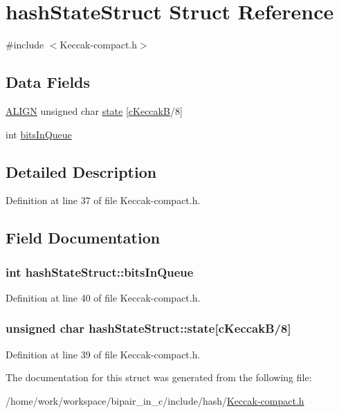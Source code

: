 \hypertarget{structhashStateStruct}{\section{hash\-State\-Struct Struct Reference}
\label{structhashStateStruct}
}


{\ttfamily \#include $<$Keccak-\/compact.\-h$>$}

\subsection*{Data Fields}
\begin{DoxyCompactItemize}
\item 
\hyperlink{Keccak-compact_8h_ae4ff5a07c6ff43ed11a3887ef7d524f2}{A\-L\-I\-G\-N} unsigned char \hyperlink{structhashStateStruct_a812d0b840fb1fe45c71da4b058d60014}{state} \mbox{[}\hyperlink{Keccak-compact-settings_8h_aadd233299e8a09d586ace2b1e0a35723}{c\-Keccak\-B}/8\mbox{]}
\item 
int \hyperlink{structhashStateStruct_a8bb9012062ade9b82adc1de210582db8}{bits\-In\-Queue}
\end{DoxyCompactItemize}


\subsection{Detailed Description}


Definition at line 37 of file Keccak-\/compact.\-h.



\subsection{Field Documentation}
\hypertarget{structhashStateStruct_a8bb9012062ade9b82adc1de210582db8}{
\subsubsection[{bits\-In\-Queue}]{\setlength{\rightskip}{0pt plus 5cm}int hash\-State\-Struct\-::bits\-In\-Queue}}\label{structhashStateStruct_a8bb9012062ade9b82adc1de210582db8}


Definition at line 40 of file Keccak-\/compact.\-h.

\hypertarget{structhashStateStruct_a812d0b840fb1fe45c71da4b058d60014}{
\subsubsection[{state}]{ unsigned char hash\-State\-Struct\-::state\mbox{[}{\bf c\-Keccak\-B}/8\mbox{]}}}\label{structhashStateStruct_a812d0b840fb1fe45c71da4b058d60014}


Definition at line 39 of file Keccak-\/compact.\-h.



The documentation for this struct was generated from the following file\-:\begin{DoxyCompactItemize}
\item 
/home/work/workspace/bipair\-\_\-in\-\_\-c/include/hash/\hyperlink{Keccak-compact_8h}{Keccak-\/compact.\-h}\end{DoxyCompactItemize}
